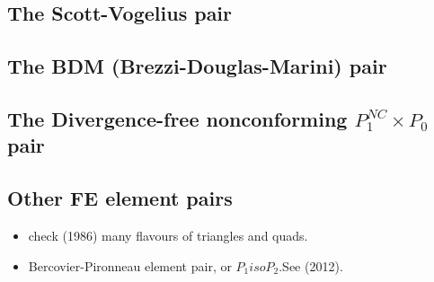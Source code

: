 \subsection{The Scott-Vogelius pair} \label{ss:scott_vogelius}


\subsection{The BDM (Brezzi-Douglas-Marini) pair} \label{ss:bdm}


\subsection{The Divergence-free nonconforming ${ P}_1^{NC}\times P_0$ pair} \label{ss:p1ncp0}



\subsection{Other FE element pairs}

\begin{itemize}

\item check \textcite{dhhu86} (1986) many flavours of triangles and quads.

\item Bercovier-Pironneau element pair, or $P_1isoP_2$.See \textcite{bocg12} (2012).

\end{itemize}


